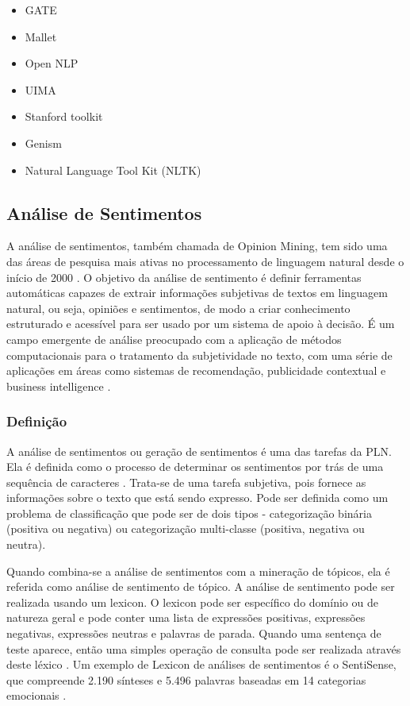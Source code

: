\documentclass[
	12pt,				%
	openright,			%
	oneside,			%
	a4paper,			%
	english,			%
	spanish,			%
	brazil				%
	]{abntex2}
\begin{document}
	\begin{itemize}
	 	\item GATE
	 	\item Mallet
	 	\item Open NLP
	 	\item UIMA
	 	\item Stanford toolkit
	 	\item Genism
	 	\item Natural Language Tool Kit (NLTK)
	\end{itemize}
	
	\subsection{Análise de Sentimentos}
		A análise de sentimentos, também chamada de Opinion Mining, tem sido uma das áreas de pesquisa mais ativas no processamento de linguagem natural desde o início de 2000 \cite{bliu_2012}. O objetivo da análise de sentimento é definir ferramentas automáticas capazes de extrair informações subjetivas de textos em linguagem natural, ou seja, opiniões e sentimentos, de modo a criar conhecimento estruturado e acessível para ser usado por um sistema de apoio à decisão. É um campo emergente de análise preocupado com a aplicação de métodos computacionais para o tratamento da subjetividade no texto, com uma série de aplicações em áreas como sistemas de recomendação, publicidade contextual e business intelligence \cite{book_discover_practices}.

	\subsubsection*{Definição}
	
	A análise de sentimentos ou geração de sentimentos é uma das tarefas da PLN. Ela é definida como o processo de determinar os sentimentos por trás de uma sequência de caracteres \cite{book_natlang_python}. Trata-se de uma tarefa subjetiva, pois fornece as informações sobre o texto que está sendo expresso. Pode ser definida como um problema de classificação que pode ser de dois tipos - categorização binária (positiva ou negativa) ou categorização multi-classe (positiva, negativa ou neutra). 
	
Quando combina-se a análise de sentimentos com a mineração de tópicos, ela é referida como análise de sentimento de tópico. A análise de sentimento pode ser realizada usando um lexicon. O lexicon pode ser específico do domínio ou de natureza geral e pode conter uma lista de expressões positivas, expressões negativas, expressões neutras e palavras de parada. Quando uma sentença de teste aparece, então uma simples operação de consulta pode ser realizada através deste léxico \cite{book_natlang_python}. Um exemplo de Lexicon de análises de sentimentos é o SentiSense, que compreende 2.190 sínteses e 5.496 palavras baseadas em 14 categorias emocionais \cite{carrilho}.
\end{document}
